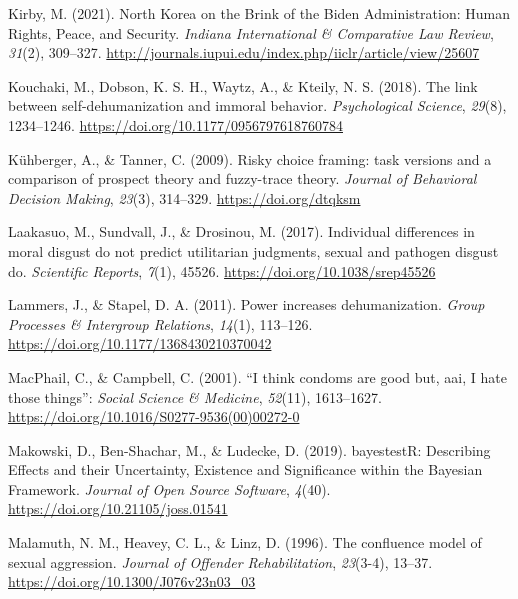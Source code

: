 \documentclass[
  donotrepeattitle,doc, 12pt, a4paper,floatsintext]{apa7}
\newlength{\cslhangindent}
\newlength{\cslentryspacingunit} %
\newenvironment{CSLReferences}[2] %
 {%
  \setlength{\parindent}{0pt}
  \ifodd #1
  \let\oldpar\par
  \def\par{\hangindent=\cslhangindent\oldpar}
  \fi
  \setlength{\parskip}{#2\cslentryspacingunit}
 }%
 {}
\begin{document}
\begin{CSLReferences}{1}{0}
\leavevmode{}%
Kirby, M. (2021). North Korea on the Brink of the Biden Administration: Human Rights, Peace, and Security. \emph{Indiana International \& Comparative Law Review}, \emph{31}(2), 309--327. \url{http://journals.iupui.edu/index.php/iiclr/article/view/25607}

\leavevmode{}%
Kouchaki, M., Dobson, K. S. H., Waytz, A., \& Kteily, N. S. (2018). The link between self-dehumanization and immoral behavior. \emph{Psychological Science}, \emph{29}(8), 1234--1246. \url{https://doi.org/10.1177/0956797618760784}

\leavevmode{}%
Kühberger, A., \& Tanner, C. (2009). Risky choice framing: task versions and a comparison of prospect theory and fuzzy-trace theory. \emph{Journal of Behavioral Decision Making}, \emph{23}(3), 314--329. \url{https://doi.org/dtqksm}

\leavevmode{}%
Laakasuo, M., Sundvall, J., \& Drosinou, M. (2017). Individual differences in moral disgust do not predict utilitarian judgments, sexual and pathogen disgust do. \emph{Scientific Reports}, \emph{7}(1), 45526. \url{https://doi.org/10.1038/srep45526}

\leavevmode{}%
Lammers, J., \& Stapel, D. A. (2011). Power increases dehumanization. \emph{Group Processes \& Intergroup Relations}, \emph{14}(1), 113--126. \url{https://doi.org/10.1177/1368430210370042}

\leavevmode{}%
MacPhail, C., \& Campbell, C. (2001). {``I think condoms are good but, aai, I hate those things''}: \emph{Social Science \& Medicine}, \emph{52}(11), 1613--1627. \url{https://doi.org/10.1016/S0277-9536(00)00272-0}

\leavevmode{}%
Makowski, D., Ben-Shachar, M., \& Ludecke, D. (2019). bayestestR: Describing Effects and their Uncertainty, Existence and Significance within the Bayesian Framework. \emph{Journal of Open Source Software}, \emph{4}(40). \url{https://doi.org/10.21105/joss.01541}

\leavevmode{}%
Malamuth, N. M., Heavey, C. L., \& Linz, D. (1996). The confluence model of sexual aggression. \emph{Journal of Offender Rehabilitation}, \emph{23}(3-4), 13--37. \url{https://doi.org/10.1300/J076v23n03_03}


\end{CSLReferences}
\end{document}
